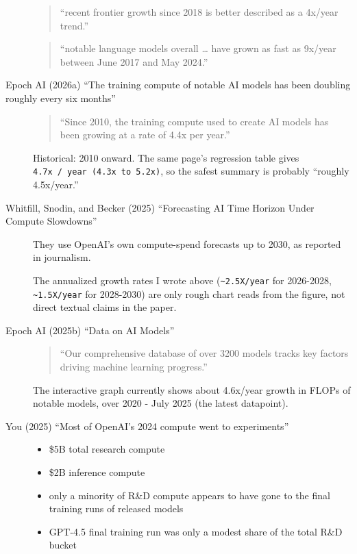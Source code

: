 \documentclass[
  11pt,
  letterpaper,
  DIV=11,
  numbers=noendperiod]{scrartcl}
\providecommand{\tightlist}{%
  \setlength{\itemsep}{0pt}\setlength{\parskip}{0pt}}
\begin{document}
\begin{description}
\begin{quote}
``recent frontier growth since 2018 is better described as a 4x/year
trend.''
\end{quote}

\begin{quote}
``notable language models overall \ldots{} have grown as fast as 9x/year
between June 2017 and May 2024.''
\end{quote}
\item[Epoch AI (2026a) ``The training compute of notable AI models has
been doubling roughly every six months'']
\begin{quote}
``Since 2010, the training compute used to create AI models has been
growing at a rate of 4.4x per year.''
\end{quote}

Historical: 2010 onward. The same page's regression table gives
\texttt{4.7x\ /\ year\ (4.3x\ to\ 5.2x)}, so the safest summary is
probably ``roughly 4.5x/year.''
\item[Whitfill, Snodin, and Becker (2025) ``Forecasting AI Time Horizon
Under Compute Slowdowns'']
They use OpenAI's own compute-spend forecasts up to 2030, as reported in
journalism.

The annualized growth rates I wrote above
(\texttt{\textasciitilde{}2.5X/year} for 2026-2028,
\texttt{\textasciitilde{}1.5X/year} for 2028-2030) are only rough chart
reads from the figure, not direct textual claims in the paper.
\item[Epoch AI (2025b) ``Data on AI Models'']
\begin{quote}
``Our comprehensive database of over 3200 models tracks key factors
driving machine learning progress.''
\end{quote}

The interactive graph currently shows about 4.6x/year growth in FLOPs of
notable models, over 2020 - July 2025 (the latest datapoint).
\item[You (2025) ``Most of OpenAI's 2024 compute went to experiments'']
\hfill
\begin{itemize}
\tightlist
\item
  \$5B total research compute
\item
  \$2B inference compute
\item
  only a minority of R\&D compute appears to have gone to the final
  training runs of released models
\item
  GPT-4.5 final training run was only a modest share of the total R\&D
  bucket
\end{itemize}
\end{description}
\end{document}
